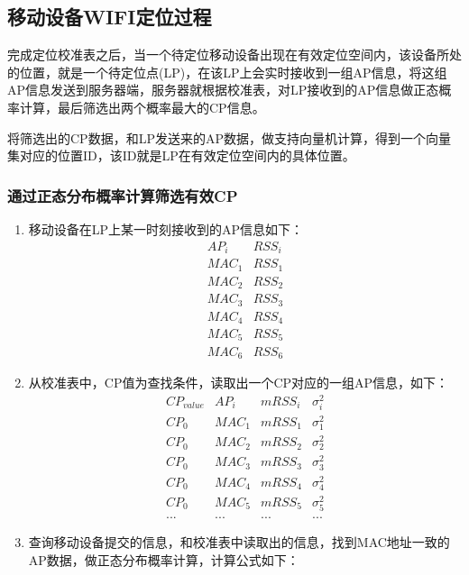 \documentclass[UTF8, twocolumn ]{ctexart}
\begin{document}
\subsection{移动设备WIFI定位过程}
完成定位校准表之后，当一个待定位移动设备出现在有效定位空间内，该设备所处的位置，就是一个待定位点(LP)，在该LP上会实时接收到一组AP信息，将这组AP信息发送到服务器端，服务器就根据校准表，对LP接收到的AP信息做正态概率计算，最后筛选出两个概率最大的CP信息。
\par
将筛选出的CP数据，和LP发送来的AP数据，做支持向量机计算，得到一个向量集对应的位置ID，该ID就是LP在有效定位空间内的具体位置。
\subsubsection{通过正态分布概率计算筛选有效CP}
\begin{enumerate}
\item 移动设备在LP上某一时刻接收到的AP信息如下：
  \begin{displaymath}
    \begin{array}{c|c}
      AP_{i} & RSS_{i} \\ \hline
      MAC_{1} & RSS_{1} \\
      MAC_{2} & RSS_{2} \\
      MAC_{3} & RSS_{3} \\
      MAC_{4} & RSS_{4} \\
      MAC_{5} & RSS_{5} \\
      MAC_{6} & RSS_{6}
    \end{array}
  \end{displaymath}
\item 从校准表中，CP值为查找条件，读取出一个CP对应的一组AP信息，如下：
  \begin{displaymath}
    \begin{array}{c|c|c|c}
      CP_{value} & AP_{i} & mRSS_{i} & \sigma^{2}_{i} \\ \hline
      CP_{0} & MAC_{1} & mRSS_{1} & \sigma^{2}_{1} \\
      CP_{0} & MAC_{2} & mRSS_{2} & \sigma^{2}_{2} \\
      CP_{0} & MAC_{3} & mRSS_{3} & \sigma^{2}_{3} \\
      CP_{0} & MAC_{4} & mRSS_{4} & \sigma^{2}_{4} \\
      CP_{0} & MAC_{5} & mRSS_{5} & \sigma^{2}_{5} \\
      ... & ... & ... & ...
    \end{array}
  \end{displaymath}
\item 查询移动设备提交的信息，和校准表中读取出的信息，找到MAC地址一致的AP数据，做正态分布概率计算，计算公式如下：

\end{enumerate}
\end{document}
